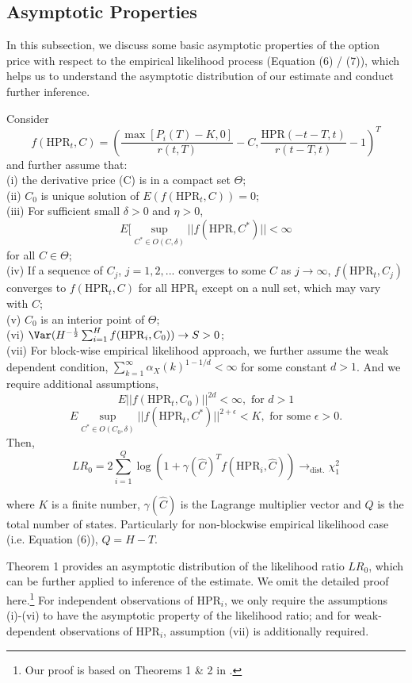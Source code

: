 \subsection{Asymptotic Properties} 
In this subsection, we discuss some basic asymptotic properties of the option price with respect to the empirical likelihood process (Equation (6) / (7)), which helps us to understand the asymptotic distribution of our estimate and conduct further inference.  
\begin{theorem}
Consider 
\[
f(\mathrm{HPR}_t,C)=\left(\frac{\max[P_i(T)-K,0]}{r(t,T)}-C, \frac{\mathrm{HPR}(-t-T,t)}{r(t-T,t)}-1\right)^T
\]
and further assume that:\\
(i) the derivative price (C) is in a compact set $\Theta$; \\
(ii) $C_0$ is unique solution of $E(f(\mathrm{HPR}_t,C))=0$;\\
(iii) For sufficient small $\delta>0$ and $\eta>0$, 
\[
E[\sup_{C^*\in O(C,\delta)}||f(\mathrm{HPR},C^*)||<\infty 
\]
for all $C \in \Theta$;\\
(iv) If a sequence of $C_j$, $j=1,2,...$ converges to some $C$ as $j\rightarrow \infty$, $f(\mathrm{HPR}_t,C_j)$ converges to $f(\mathrm{HPR}_t,C)$ for all $\mathrm{HPR}_t$ except on a null set, which may vary with $C$;\\
(v) $C_0$ is an interior point of $\Theta$;\\
(vi) $\Var(H^{-\frac{1}{2}} \sum_{i=1}^H f(\mathrm{HPR}_i,C_0))\rightarrow S >0$;\\
(vii) For block-wise empirical likelihood approach, we further assume the weak dependent condition, $\sum_{k=1}^\infty \alpha_X(k)^{1-1/d} <\infty$ for some constant $d>1$. And we require additional assumptions, 
\[
E||f(\mathrm{HPR}_t,C_0)||^{2d}<\infty, \text{ for } d>1 
\]  
\[
E \sup_{C^* \in O(C_0,\delta)} ||f(\mathrm{HPR}_t,C^*)||^{2+\epsilon}<K, \text{ for some }\epsilon>0.
\]
Then, 
\[
LR_0=2\sum_{i=1}^Q \log(1+\gamma(\hat{C})^T f(\mathrm{HPR}_i,\hat{C})) \rightarrow_{\mathrm{dist.}}  \chi _1^2
\]
\end{theorem}
where $K$ is a finite number, $\gamma(\hat{C})$ is the Lagrange multiplier vector and $Q$ is the total number of states. Particularly for non-blockwise empirical likelihood case (i.e. Equation (6)), $Q=H-T$.

Theorem 1 provides an asymptotic distribution of the likelihood ratio $LR_0$, which can be further applied to inference of the estimate. We omit the detailed proof here.\footnote{Our proof is based on Theorems 1 \& 2 in \citet{kitamura1997empirical}. } For independent observations of $\mathrm{HPR}_i$, we only require the assumptions (i)-(vi) to have the asymptotic property of the likelihood ratio; and for weak-dependent observations of $\mathrm{HPR}_i$, assumption (vii) is additionally required. 




